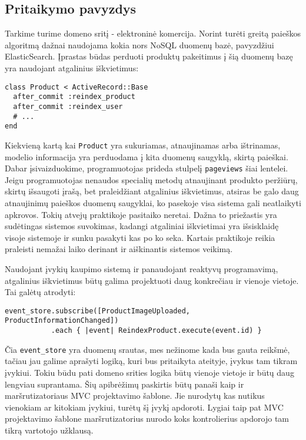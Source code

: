 \subsection{Pritaikymo pavyzdys}

Tarkime turime domeno sritį - elektroninė komercija. Norint turėti greitą paieškos algoritmą dažnai naudojama kokia nors NoSQL duomenų bazė, pavyzdžiui ElasticSearch. Įprastas būdas perduoti produktų pakeitimus į šią duomenų bazę yra naudojant atgalinius iškvietimus:

\begin{lstlisting}[]
class Product < ActiveRecord::Base
  after_commit :reindex_product
  after_commit :reindex_user
  # ...
end
\end{lstlisting}

Kiekvieną kartą kai \lstinline|Product| yra sukuriamas, atnaujinamas arba ištrinamas, modelio informacija yra perduodama į kita duomenų saugyklą, skirtą paieškai. Dabar įsivaizduokime, programuotojas prideda stulpelį \lstinline|pageviews| šiai lentelei. Jeigu programuotojas nenaudos specialių metodų atnaujinant produkto peržiūrų, skirtų išsaugoti įrašą, bet praleidžiant atgalinius iškvietimus, atsiras be galo daug atnaujinimų paieškos duomenų saugyklai, ko pasekoje visa sistema gali neatlaikyti apkrovos. Tokių atvejų praktikoje pasitaiko neretai. Dažna to priežastis yra sudėtingas sistemos suvokimas, kadangi atgaliniai iškvietimai yra išsisklaidę visoje sistemoje ir sunku pasakyti kas po ko seka. Kartais praktikoje reikia praleisti nemažai laiko derinant ir aiškinantis sistemos veikimą.

Naudojant įvykių kaupimo sistemą ir panaudojant reaktyvų programavimą, atgalinius iškvietimus būtų galima projektuoti daug konkrečiau ir vienoje vietoje. Tai galėtų atrodyti:

\begin{lstlisting}[]
event_store.subscribe([ProductImageUploaded, ProductInformationChanged])
           .each { |event| ReindexProduct.execute(event.id) }
\end{lstlisting}

Čia \lstinline|event_store| yra duomenų srautas, mes nežinome kada bus gauta reikšmė, tačiau jau galime aprašyti logiką, kuri bus pritaikyta ateityje, įvykus tam tikram įvykiui. Tokiu būdu pati domeno srities logika būtų vienoje vietoje ir būtų daug lengviau suprantama. Šių apibrėžimų paskirtis būtų panaši kaip ir maršrutizatoriaus MVC projektavimo šablone. Jie nurodytų kas nutikus vienokiam ar kitokiam įvykiui, turėtų šį įvykį apdoroti. Lygiai taip pat MVC projektavimo šablone maršrutizatorius nurodo koks kontrolierius apdorojo tam tikrą vartotojo užklausą.

